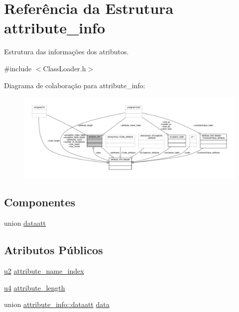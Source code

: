 \hypertarget{structattribute__info}{}\section{Referência da Estrutura attribute\+\_\+info}
\label{structattribute__info}


Estrutura das informações dos atributos.  




{\ttfamily \#include $<$Class\+Loader.\+h$>$}



Diagrama de colaboração para attribute\+\_\+info\+:\nopagebreak
\begin{figure}[H]
\begin{center}
\leavevmode
\includegraphics[width=350pt]{structattribute__info__coll__graph}
\end{center}
\end{figure}
\subsection*{Componentes}
\begin{DoxyCompactItemize}
\item 
union \hyperlink{unionattribute__info_1_1dataatt}{dataatt}
\end{DoxyCompactItemize}
\subsection*{Atributos Públicos}
\begin{DoxyCompactItemize}
\item 
\hyperlink{ClassLoader_8h_a5f223212eef04d10a4550ded680cb1cf}{u2} \hyperlink{structattribute__info_a19df9d4b42eb55ca5dc1bed98df89378}{attribute\+\_\+name\+\_\+index}
\item 
\hyperlink{ClassLoader_8h_aedf6ddc03df8caaaccbb4c60b9a9b850}{u4} \hyperlink{structattribute__info_a1ed8f679458c4bb0ed3315721588f50d}{attribute\+\_\+length}
\item 
union \hyperlink{unionattribute__info_1_1dataatt}{attribute\+\_\+info\+::dataatt} \hyperlink{structattribute__info_a63cd7230a276bdc8fc0d9eefc730c0db}{data}
\end{DoxyCompactItemize}


